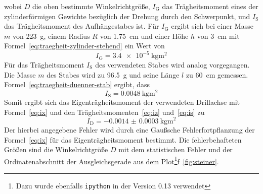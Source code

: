 %
wobei $D$ die oben bestimmte Winkelrichtgröße, $I_\text{G}$ das
Trägheitsmoment eines der zylinderförmigen Gewichte bezüglich der
Drehung durch den Schwerpunkt, und $I_\text{S}$ das Trägheitsmoment des
Aufhängestabes ist.  Für $I_\text{G}$ ergibt sich bei einer Masse $m$
von \SI{223}{\gram}, einem Radius $R$ von \SI{1.75}{\centi\metre} und
einer Höhe $h$ von \SI{3}{\centi\metre} mit
Formel~\eqref{eq:traegheit-zylinder-stehend} ein Wert von
%
\begin{equation}
I_\text{G} = \SI{3.4e-5}{\kilo\gram\metre^2}
\label{eq:iz}
\end{equation}
%
Für das Trägheitsmoment $I_\text{S}$ des verwendeten Stabes wird analog
vorgegangen. Die Masse $m$ des Stabes wird zu \SI{96.5}{\gram} und seine
Länge $l$ zu \SI{60}{\centi\metre} gemessen.
Formel~\eqref{eq:traegheit-duenner-stab} ergibt, dass
%
\begin{equation}
I_\text{S} = \SI{0.0048}{\kilo\gram\metre^2}
\label{eq:is}
\end{equation}
%
Somit ergibt sich das Eigenträgheitsmoment der verwendeten Drillachse
mit Formel~\eqref{eq:ix} und den Trägheitsmomenten~\eqref{eq:iz}
und~\eqref{eq:is} zu
%
\begin{equation}
I_\text{D} = \SI{-0.0014(3)}{\kilo\gram\metre^2}
\end{equation}
%
Der hierbei angegebene Fehler wird durch eine Gaußsche
Fehlerfortpflanzung der Formel~\eqref{eq:ix} für das
Eigenträgheitsmoment bestimmt. Die fehlerbehafteten Größen sind die
Winkelrichtgröße $D$ mit dem statistischen Fehler und der
Ordinatenabschnitt der Ausgleichsgerade aus dem Plot\footnote{Dazu wurde
  ebenfalls \texttt{ipython} in der Version 0.13
  verwendet}f~\ref{fig:steiner}.
%
\FloatBarrier
